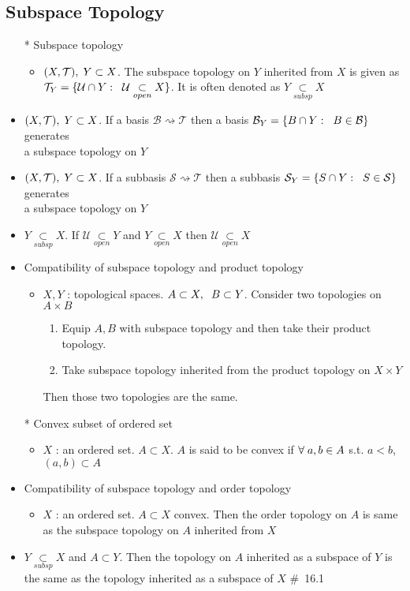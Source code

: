 \documentclass[12pt]{article}
\newcommand{\sptwo}{\hspace{0.2cm}}
\newcommand{\spone}{\hspace{0.1cm}}
\newcommand{\open}{\underset{open}{\subset}}
\newcommand{\subsp}{\underset{subsp}{\subset}}
\begin{document}
\subsection{Subspace Topology}
\smallskip
\begin{itemize}
	\item[*] Subspace topology
	\begin{itemize}
		\item $(X,\mathcal{T}), \spone Y\subset X$. The subspace topology on $Y$ inherited from $X$ is given as \\ $\mathcal{T}_Y=\{\mathcal{U}\cap Y : \sptwo \mathcal{U}\open X\}$. It is often denoted as $Y\subsp X$
	\end{itemize}
	\item $(X,\mathcal{T}), \spone Y\subset X$. If a basis $\mathcal{B}\rightsquigarrow \mathcal{T}$ then a basis $\mathcal{B}_Y=\{B\cap Y : \sptwo B\in \mathcal{B}\}$ generates \\ a subspace topology on $Y$
	\item $(X,\mathcal{T}), \spone Y\subset X$. If a subbasis $\mathcal{S}\rightsquigarrow \mathcal{T}$ then a subbasis $\mathcal{S}_Y=\{S\cap Y : \sptwo S\in \mathcal{S}\}$ generates \\ a subspace topology on $Y$
	\item $Y\subsp X$. If $\mathcal{U}\open Y$ and $Y\open X$ then $\mathcal{U}\open X$
	\item Compatibility of subspace topology and product topology
	\begin{itemize}
		\item $X,Y$ : topological spaces. $A\subset X,\sptwo B\subset Y$. Consider two topologies on $A\times B$
		\begin{enumerate}
			\item Equip $A, B$ with subspace topology and then take their product topology.
			\item Take subspace topology inherited from the product topology on $X\times Y$
		\end{enumerate}
		Then those two topologies are the same.
	\end{itemize}
	\item[*] Convex subset of ordered set
	\begin{itemize}
		\item $X$ : an ordered set. $A\subset X$. $A$ is said to be convex if $\forall \spone a,b\in A$ s.t. $a<b$, $(a,b)\subset A$
	\end{itemize}
	\item Compatibility of subspace topology and order topology
	\begin{itemize}
		\item $X$ : an ordered set. $A\subset X$ convex. Then the order topology on $A$ is same as the subspace topology on $A$ inherited from $X$
	\end{itemize}
	\item $Y\subsp X$ and $A\subset Y$. Then the topology on $A$ inherited as a subspace of $Y$ is the same as the topology inherited as a subspace of $X$ \quad \#\ 16.1
\end{itemize}
\end{document}
